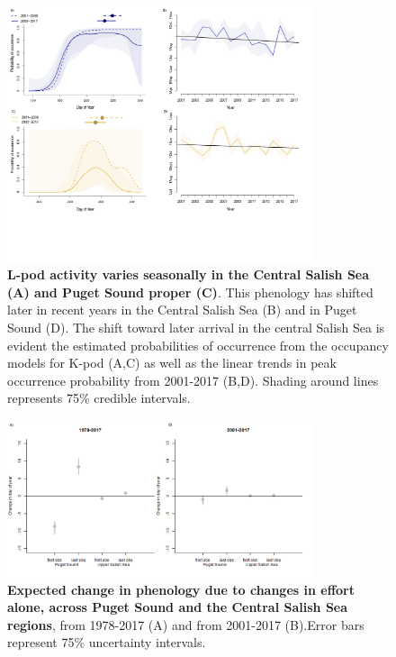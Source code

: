 \documentclass{article}
\begin{document}
\begin{figure}[!hp]
\includegraphics[width=0.8\textwidth]{../analyses/figures/proboccL_4panels.png} 
\caption{\textbf{L-pod activity varies seasonally in the Central Salish Sea (A) and Puget Sound proper (C)}. This phenology has shifted later in recent years in the Central Salish Sea (B) and in Puget Sound (D). The shift toward later arrival in the central Salish Sea is evident the estimated probabilities of occurrence from the occupancy models for K-pod (A,C) as well as the linear trends in peak occurrence probability from 2001-2017 (B,D). Shading around lines represents 75\% credible intervals. 
}
\label{fig:Lprobs}
\end{figure}

\begin{figure}[!hp]
\includegraphics[width=0.8\textwidth]{../analyses/orcaphen/figures/simeffortonly2panels.png} 
\caption{\textbf{Expected change in phenology due to changes in effort alone, across Puget Sound and the Central Salish Sea regions}, from 1978-2017 (A) and from 2001-2017 (B).Error bars represent 75\% uncertainty intervals. }
\label{fig:simeffort}
\end{figure}

\pagebreak


  
\end{document}
